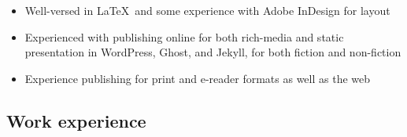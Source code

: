 \begin{itemize}
  \item Well-versed in \LaTeX\ and some experience with Adobe InDesign for layout
  \item Experienced with publishing online for both rich-media and static presentation in WordPress, Ghost, and Jekyll, for both fiction and non-fiction
  \item Experience publishing for print and e-reader formats as well as the web
\end{itemize}

\newpage

\subsection{Work experience}

